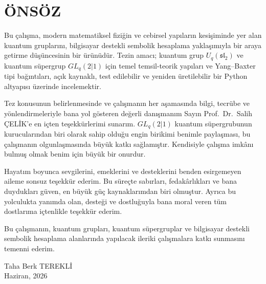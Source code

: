 \documentclass[12pt,a4paper,fleqn]{report}
\numberwithin{equation}{chapter}
\renewcommand{\contentsname}{İÇİNDEKİLER}%
\theoremstyle{plain}
\theoremstyle{definition}
\renewcommand{\sl}{\mathfrak{sl}}
\newcommand{\Uq}{U_q(\sl_2)}
\newcommand{\Ogrenci}{Taha Berk TEREKLİ}
\newcommand{\Danisman}{Prof.\ Dr.\ Salih ÇELİK}
\newcommand{\TarihAy}{Haziran}
\newcommand{\TarihYil}{2026}
\begin{document}
\thispagestyle{empty} %
\chapter*{ÖNSÖZ}

Bu çalışma, modern matematiksel fiziğin ve cebirsel yapıların kesişiminde yer alan
kuantum gruplarını, bilgisayar destekli sembolik hesaplama yaklaşımıyla bir araya
getirme düşüncesinin bir ürünüdür. Tezin amacı; kuantum grup $\Uq$ ve kuantum
süpergrup $GL_q(2|1)$ için temel temsil-teorik yapıları ve Yang--Baxter tipi
bağıntıları, açık kaynaklı, test edilebilir ve yeniden üretilebilir bir Python
altyapısı üzerinde incelemektir.

Tez konusunun belirlenmesinde ve çalışmanın her aşamasında bilgi, tecrübe ve
yönlendirmeleriyle bana yol gösteren değerli danışmanım Sayın \Danisman'e en içten
teşekkürlerimi sunarım. $GL_q(2|1)$ kuantum süpergrubunun kurucularından biri olarak
sahip olduğu engin birikimi benimle paylaşması, bu çalışmanın olgunlaşmasında büyük
katkı sağlamıştır. Kendisiyle çalışma imkânı bulmuş olmak benim için büyük bir
onurdur.

Hayatım boyunca sevgilerini, emeklerini ve desteklerini benden esirgemeyen aileme
sonsuz teşekkür ederim. Bu süreçte sabırları, fedakârlıkları ve bana duydukları
güven, en büyük güç kaynaklarımdan biri olmuştur. Ayrıca bu yolculukta yanımda olan,
desteği ve dostluğuyla bana moral veren tüm dostlarıma içtenlikle teşekkür ederim.

Bu çalışmanın, kuantum grupları, kuantum süpergruplar ve bilgisayar destekli sembolik
hesaplama alanlarında yapılacak ileriki çalışmalara katkı sunmasını temenni ederim.

\vspace{1.5cm}
\begin{flushright}
\Ogrenci\\
\TarihAy, \TarihYil
\end{flushright}
\clearpage

\renewcommand{\contentsname}{İÇİNDEKİLER}
\tableofcontents
\clearpage

\end{document}
